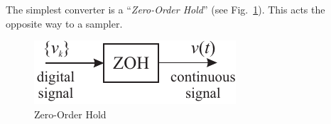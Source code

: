 The simplest converter is a ``\emph{Zero-Order Hold}'' (see
Fig.~\ref{fig:l11f1}). This acts the opposite way to a sampler.
\begin{figure}[htbp]
  \begin{center}
    \includegraphics{pictures/zoh.pdf}
    \caption{Zero-Order Hold}
    \label{fig:l11f1}
  \end{center}
\end{figure}
\endinput
